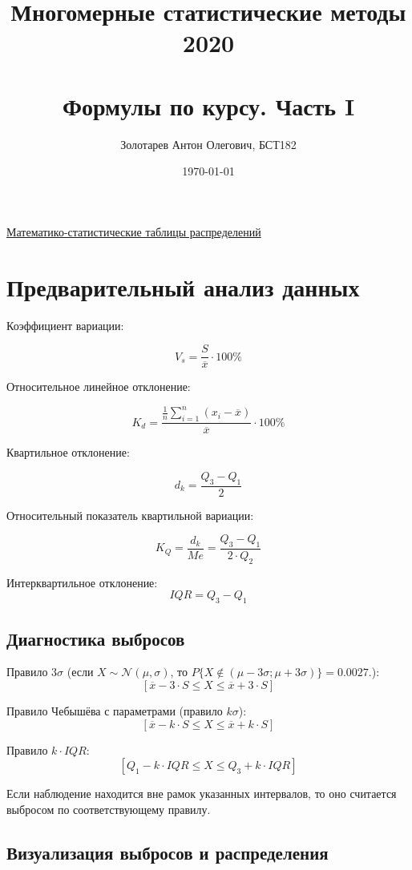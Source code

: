 \documentclass[a4paper,12pt]{article} %
\author{Золотарев Антон Олегович, БСТ182}
\title{Многомерные статистические методы 2020 \\
\\

\large Формулы по курсу. Часть I}
\date{\today}
\begin{document}

\maketitle

\tableofcontents

\href{https://github.com/Shred27/MSM/blob/main/Table_of_distributions_Mironkina.pdf}{Математико-статистические таблицы распределений}

\section{Предварительный анализ данных}

Коэффициент вариации:

\[V_s=\frac{S}{\overline{x}}\cdot 100\%\]

Относительное линейное отклонение:

\[K_d = \frac{\frac{1}{n}\sum\limits_{i=1}^{n}(x_i-\overline{x})}{\overline{x}}\cdot100\%\]

Квартильное отклонение:

\[d_k=\frac{Q_3-Q_1}{2}\]

Относительный показатель квартильной вариации:

\[K_Q=\frac{d_k}{Me}=\frac{Q_3-Q_1}{2\cdot Q_2}\]

Интерквартильное отклонение:
\[IQR=Q_3-Q_1\]

\subsection{Диагностика выбросов}

Правило $3\sigma$ (если $X \sim \mathcal{N} (\mu, \sigma)$, то $P\{X \notin (\mu-3\sigma; \mu+3\sigma)\} = 0.0027$.):
\[\left[\overline{x}-3\cdot S\le X \le \overline{x}+3\cdot S\right]\]

Правило Чебышёва с параметрами (правило $k\sigma$): 
\[\left[\overline{x}-k\cdot S\le X \le \overline{x}+k\cdot S\right]\]

Правило $k\cdot IQR$:
\[\left[Q_1-k\cdot IQR\le X \le Q_3+k\cdot IQR\right]\]

Если наблюдение находится вне рамок указанных интервалов, то оно считается выбросом по соответствующему правилу.

\subsection{Визуализация выбросов и распределения}
\end{document}
